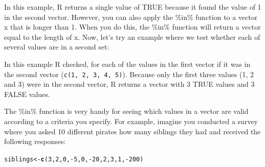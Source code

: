 \documentclass{tufte-book}\usepackage[]{graphicx}\usepackage[]{color}
\makeatletter
\newcommand{\hlnum}[1]{\textcolor[rgb]{0.686,0.059,0.569}{#1}}%
\newcommand{\hlopt}[1]{\textcolor[rgb]{0,0,0}{#1}}%
\newcommand{\hlstd}[1]{\textcolor[rgb]{0.345,0.345,0.345}{#1}}%
\newcommand{\hlkwb}[1]{\textcolor[rgb]{0.69,0.353,0.396}{#1}}%
\newcommand{\hlkwd}[1]{\textcolor[rgb]{0.737,0.353,0.396}{\textbf{#1}}}%
\newenvironment{kframe}{%
 \def\at@end@of@kframe{}%
 \ifinner\ifhmode%
  \def\at@end@of@kframe{\end{minipage}}%
  \begin{minipage}{\columnwidth}%
 \fi\fi%
 \def\FrameCommand##1{\hskip\@totalleftmargin \hskip-\fboxsep
 \colorbox{shadecolor}{##1}\hskip-\fboxsep
     \hskip-\linewidth \hskip-\@totalleftmargin \hskip\columnwidth}%
 \MakeFramed {\advance\hsize-\width
   \@totalleftmargin\z@ \linewidth\hsize
   \@setminipage}}%
 {\par\unskip\endMakeFramed%
 \at@end@of@kframe}
\newenvironment{knitrout}{}{} %
\makeatother
\begin{document}
\begin{footnotesize}
In this example, R returns a single value of TRUE because it found the value of 1 in the second vector. However, you can also apply the \%in\% function to a vector x that is longer than 1. When you do this, the \%in\% function will return a vector equal to the length of x. Now, let's try an example where we test whether each of several values are in a second set:


In this example R checked, for each of the values in the first vector if it was in the second vector (\texttt{c(1, 2, 3, 4, 5)}). Because only the first three values (1, 2 and 3) were in the second vector, R returns a vector with 3 TRUE values and 3 FALSE values.

The \%in\% function is very handy for seeing which values in a vector are valid according to a criteria you specify. For example, imagine you conducted a survey where you asked 10 different pirates how many siblings they had and received the following responses:

\begin{knitrout}
\color{fgcolor}\begin{kframe}
\begin{alltt}
\hlstd{siblings} \hlkwb{<-} \hlkwd{c}\hlstd{(}\hlnum{3}\hlstd{,} \hlnum{2}\hlstd{,} \hlnum{0}\hlstd{,} \hlopt{-}\hlnum{5}\hlstd{,} \hlnum{0}\hlstd{,} \hlopt{-}\hlnum{20}\hlstd{,} \hlnum{2}\hlstd{,} \hlnum{3}\hlstd{,} \hlnum{1}\hlstd{,} \hlopt{-}\hlnum{200}\hlstd{)}
\end{alltt}
\end{kframe}
\end{knitrout}


\end{footnotesize}
\end{document}
